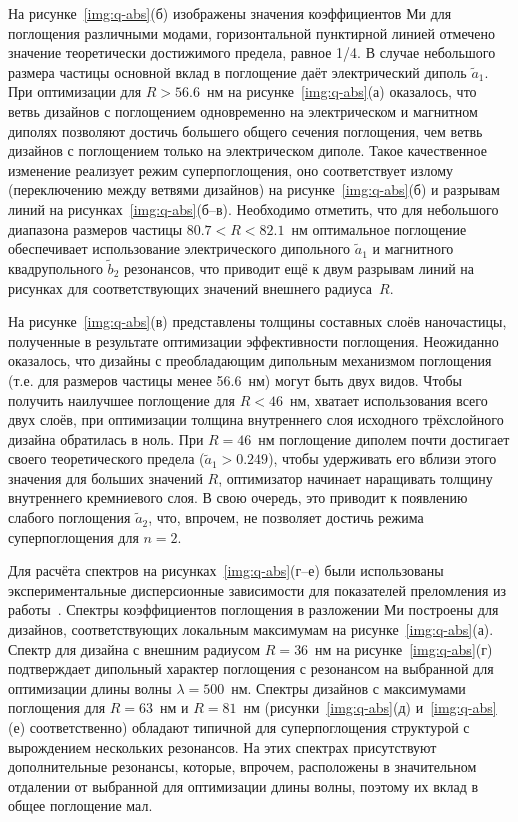 На рисунке~\ref{img:q-abs}(б) изображены значения коэффициентов Ми для
поглощения различными модами, горизонтальной пунктирной линией
отмечено значение теоретически достижимого предела, равное 1/4. В
случае небольшого размера частицы основной вклад в поглощение даёт
электрический диполь $\tilde{a}_1$.  При оптимизации для
$R > 56.6$~нм на рисунке~\ref{img:q-abs}(а) оказалось, что ветвь
дизайнов с поглощением одновременно на электрическом и магнитном
диполях позволяют достичь большего общего сечения поглощения, чем
ветвь дизайнов с поглощением только на электрическом диполе. Такое
качественное изменение реализует режим суперпоглощения, оно
соответствует излому (переключению между ветвями дизайнов) на
рисунке~\ref{img:q-abs}(б) и разрывам линий на
рисунках~\ref{img:q-abs}(б--в).  Необходимо отметить, что для
небольшого диапазона размеров частицы $80.7<R<82.1$~нм оптимальное
поглощение обеспечивает использование электрического дипольного
$\tilde{a}_1$ и магнитного квадрупольного $\tilde{b}_2$ резонансов,
что приводит ещё к двум разрывам линий на рисунках для соответствующих
значений внешнего радиуса~$R$.

На рисунке~\ref{img:q-abs}(в) представлены толщины составных слоёв
наночастицы, полученные в результате оптимизации эффективности
поглощения.  Неожиданно оказалось, что дизайны с преобладающим
дипольным механизмом поглощения (т.е. для размеров частицы менее
56.6~нм) могут быть двух видов.  Чтобы получить наилучшее поглощение
для $R<46$~нм, хватает использования всего двух слоёв, при оптимизации
толщина внутреннего слоя исходного трёхслойного дизайна обратилась в
ноль.  При $R=46$~нм поглощение диполем почти достигает своего
теоретического предела ($\tilde{a}_1>0.249$), чтобы удерживать его
вблизи этого значения для больших значений $R$, оптимизатор начинает
наращивать толщину внутреннего кремниевого слоя.  В свою очередь, это
приводит к появлению слабого поглощения  $\tilde{a}_2$,
что, впрочем, не позволяет достичь режима суперпоглощения для $n=2$.

Для расчёта спектров на рисунках~\ref{img:q-abs}(г--е) были
использованы экспериментальные дисперсионные зависимости для
показателей преломления из работы~\cite{palik-1997}. Спектры
коэффициентов поглощения в разложении Ми построены для дизайнов,
соответствующих локальным максимумам на
рисунке~\ref{img:q-abs}(а). Спектр для дизайна с внешним радиусом
$R=36$~нм на рисунке~\ref{img:q-abs}(г) подтверждает дипольный
характер поглощения с резонансом на выбранной для оптимизации длины
волны $\lambda=500$~нм.  Спектры дизайнов с максимумами поглощения для
$R=63$~нм и $R=81$~нм (рисунки~\ref{img:q-abs}(д) и~\ref{img:q-abs}(е)
соответственно) обладают типичной для суперпоглощения структурой с
вырождением нескольких резонансов. На этих спектрах присутствуют
дополнительные резонансы, которые, впрочем, расположены в значительном
отдалении от выбранной для оптимизации длины волны, поэтому их вклад в
общее поглощение мал.

